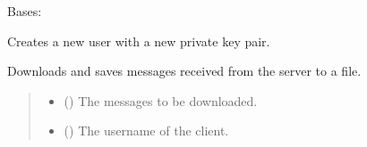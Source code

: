 \documentclass[letterpaper,10pt,english]{sphinxmanual}
\begin{document}
\begin{fulllineitems}
\label{\detokenize{client1:client1.Client}}
\pysigstartsignatures
{}
\pysigstopsignatures
\sphinxAtStartPar
Bases: 

\begin{fulllineitems}
\label{\detokenize{client1:client1.Client.create_new_user}}
\pysigstartsignatures
{}
\pysigstopsignatures
\sphinxAtStartPar
Creates a new user with a new private key pair.

\end{fulllineitems}


\begin{fulllineitems}
\label{\detokenize{client1:client1.Client.download_messages}}
\pysigstartsignatures
{}
\pysigstopsignatures
\sphinxAtStartPar
Downloads and saves messages received from the server to a file.
\begin{quote}\begin{description}
\begin{itemize}
\item {} 
\sphinxAtStartPar
{} () \textendash{} The messages to be downloaded.

\item {} 
\sphinxAtStartPar
{} () \textendash{} The username of the client.

\end{itemize}

\end{description}\end{quote}


\end{fulllineitems}
\end{fulllineitems}
\end{document}
